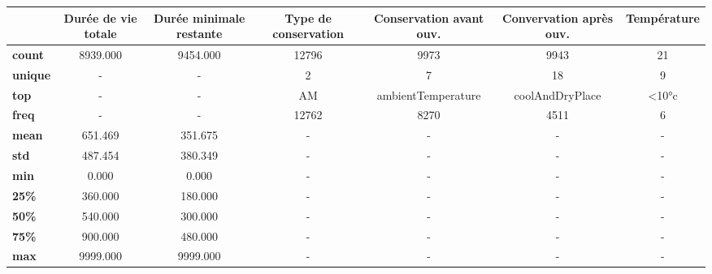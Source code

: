 \begin{tabular}{lcccccc}
\toprule
{} &  Durée de vie totale &  Durée minimale restante & Type de conservation & Conservation avant ouv. & Convervation après ouv. & Température \\
\midrule
\textbf{count } &             8939.000 &                 9454.000 &                12796 &                    9973 &                    9943 &          21 \\
\textbf{unique} &                    - &                        - &                    2 &                       7 &                      18 &           9 \\
\textbf{top   } &                    - &                        - &                   AM &      ambientTemperature &         coolAndDryPlace &       <10°c \\
\textbf{freq  } &                    - &                        - &                12762 &                    8270 &                    4511 &           6 \\
\textbf{mean  } &              651.469 &                  351.675 &                    - &                       - &                       - &           - \\
\textbf{std   } &              487.454 &                  380.349 &                    - &                       - &                       - &           - \\
\textbf{min   } &                0.000 &                    0.000 &                    - &                       - &                       - &           - \\
\textbf{25\%   } &              360.000 &                  180.000 &                    - &                       - &                       - &           - \\
\textbf{50\%   } &              540.000 &                  300.000 &                    - &                       - &                       - &           - \\
\textbf{75\%   } &              900.000 &                  480.000 &                    - &                       - &                       - &           - \\
\textbf{max   } &             9999.000 &                 9999.000 &                    - &                       - &                       - &           - \\
\bottomrule
\end{tabular}
